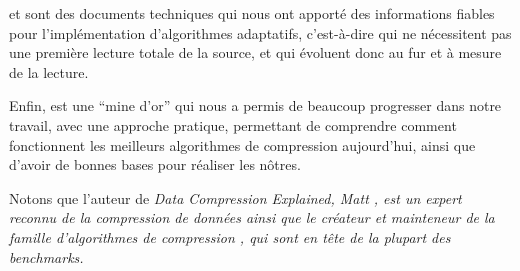 \documentclass[a4paper, 11pt]{article}
\begin{document}
\cite{algo_adapt} et \cite{huff_dyn} sont des documents techniques qui nous ont apporté des informations fiables pour l'implémentation d'algorithmes adaptatifs, c'est-à-dire qui ne nécessitent pas une première lecture totale de la source, et qui évoluent donc au fur et à mesure de la lecture.

Enfin, \cite{data_comp_explained} est une ``mine d'or'' qui nous a permis de beaucoup progresser dans notre travail, avec une approche pratique, permettant de comprendre comment fonctionnent les meilleurs algorithmes de compression aujourd'hui, ainsi que d'avoir de bonnes bases pour réaliser les nôtres.

Notons que l'auteur de \it{Data Compression Explained}, Matt , est un expert reconnu de la compression de données ainsi que le créateur et mainteneur de la famille d'algorithmes de compression , qui sont en tête de la plupart des \it{benchmarks}.
\end{document}
